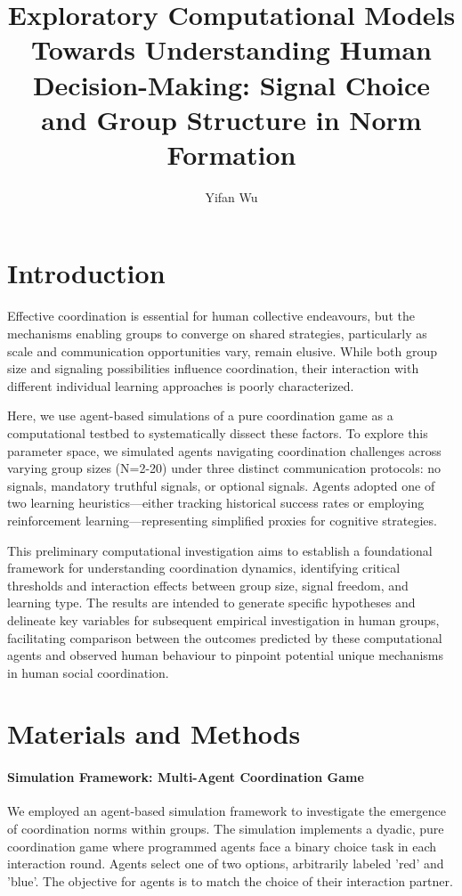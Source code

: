 \documentclass[12pt,a4paper]{article}
\title{Exploratory Computational Models Towards Understanding Human Decision-Making: Signal Choice and Group Structure in Norm Formation}
\author{Yifan Wu}
\date{}
\begin{document}
\maketitle

\section{Introduction}

Effective coordination is essential for human collective endeavours, but the mechanisms enabling groups to converge on shared strategies, particularly as scale and communication opportunities vary, remain elusive. While both group size and signaling possibilities influence coordination, their interaction with different individual learning approaches is poorly characterized. 

Here, we use agent-based simulations of a pure coordination game as a computational testbed to systematically dissect these factors. To explore this parameter space, we simulated agents navigating coordination challenges across varying group sizes (N=2-20) under three distinct communication protocols: no signals, mandatory truthful signals, or optional signals. Agents adopted one of two learning heuristics—either tracking historical success rates or employing reinforcement learning—representing simplified proxies for cognitive strategies. 

This preliminary computational investigation aims to establish a foundational framework for understanding coordination dynamics, identifying critical thresholds and interaction effects between group size, signal freedom, and learning type. The results are intended to generate specific hypotheses and delineate key variables for subsequent empirical investigation in human groups, facilitating comparison between the outcomes predicted by these computational agents and observed human behaviour to pinpoint potential unique mechanisms in human social coordination.

\section{Materials and Methods}
\paragraph{Simulation Framework: Multi-Agent Coordination Game}
We employed an agent-based simulation framework to investigate the emergence of coordination norms within groups. The simulation implements a dyadic, pure coordination game where programmed agents face a binary choice task in each interaction round. Agents select one of two options, arbitrarily labeled 'red' and 'blue'. The objective for agents is to match the choice of their interaction partner.
\end{document}
